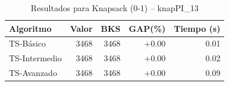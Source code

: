 \begin{table}[h]
\centering
\caption{Resultados para Knapsack (0-1) -- knapPI_13}
\label{tab:knapsack_knapPI_13}
\begin{tabular}{lrrrr}
\hline
\textbf{Algoritmo} & \textbf{Valor} & \textbf{BKS} & \textbf{GAP(\%)} & \textbf{Tiempo (s)} \\
\hline
TS-Básico & 3468 & 3468 & +0.00 & 0.01 \\
TS-Intermedio & 3468 & 3468 & +0.00 & 0.02 \\
TS-Avanzado & 3468 & 3468 & +0.00 & 0.09 \\
\hline
\end{tabular}
\end{table}
